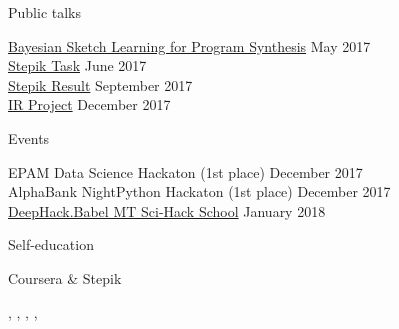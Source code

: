 \documentclass{resume} %
\newcommand{\SKIP}{\vspace{-1.5\baselineskip}}
\begin{document}
\begin{rSection}{Public talks}

{\href{https://docs.google.com/presentation/d/1ieE0JZWKbCQH_qpH81M1pSbUSARBP7DKLdGVwk563pM/pub?start=false&loop=false&delayms=3000}{Bayesian Sketch Learning for Program Synthesis}} \hfill May 2017 \\ 
{\href{https://docs.google.com/presentation/d/19FyHBksjffXY6nF1B1xRvkkW-lSp0QIPzU_o-h5RD00/pub?start=false&loop=false&delayms=3000}{Stepik Task}} \hfill June 2017 \\
{\href{https://docs.google.com/presentation/d/e/2PACX-1vSooVyWYFG1swzqGyjLB7dYQ9sLMzzg_s-GqHXBTOw21FyBzhWBtI73wAZlr5lATY5iqEstFBe--Opc/pub?start=false&loop=false&delayms=3000}{Stepik Result}} \hfill September 2017 \\
{\href{https://docs.google.com/presentation/d/e/2PACX-1vT5Qs8ly5csvfrqpafVQ4H0pQTr0U1S1XYF1gudEBVSxXaMwgUgVN4zEBDhO11j3d2Td7VmJ_PK6VGJ/pub?start=false&loop=false&delayms=3000&slide=id.p}{IR Project}} \hfill December 2017 \\

\end{rSection} 
\SKIP
\begin{rSection}{Events}

EPAM Data Science Hackaton (1st place) \hfill December 2017 \\
AlphaBank NightPython Hackaton (1st place) \hfill December 2017 \\
\href{http://babel.tilda.ws/}{DeepHack.Babel MT Sci-Hack School} \hfill January 2018 \\

\end{rSection} 
\SKIP
\begin{rSection}{Self-education}

\begin{rSubsection}{Coursera \& Stepik}{}{}{} 
\item[] , , , , 
\end{rSubsection}

\end{rSection} 
\end{document}
